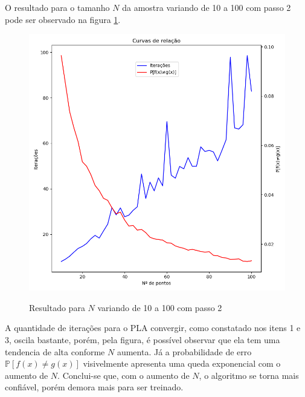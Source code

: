 \begin{enumerate}
    O resultado para o tamanho $N$ da amostra variando de 10 a 100 com passo 2 pode ser observado na figura \ref{fig:perceptron_relationship_plot}. 

    \begin{figure}[H]
        \caption{Resultado para $N$ variando de 10 a 100 com passo 2}
           \centering
           \includegraphics[width=12cm]{perceptron_relationship_plot.png}
        \label{fig:perceptron_relationship_plot}
    \end{figure}

    A quantidade de iterações para o PLA convergir, como constatado nos itens 1 e 3, oscila bastante, porém, pela figura, é possível observar que ela tem uma tendencia de alta conforme $N$ aumenta. Já a probabilidade de erro $\mathbb{P}[f(x) \neq g(x)]$ visivelmente apresenta uma queda exponencial com o aumento de $N$. Conclui-se que, com o aumento de $N$, o algoritmo se torna mais confiável, porém demora mais para ser treinado.
    
    
\end{enumerate}